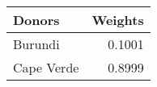 \begin{tabular}{lr}
\toprule
    Donors &  Weights \\
\midrule
   Burundi &   0.1001 \\
Cape Verde &   0.8999 \\
\bottomrule
\end{tabular}
